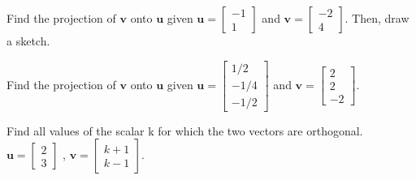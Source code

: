 \documentclass[12pt,letterpaper]{hmcpset}
\begin{document}

\begin{problem}[40]
Find the projection of $\mathbf{v}$ onto $\mathbf{u}$ given 
$\mathbf{u} = \begin{bmatrix}  -1\\ 1 \end{bmatrix} $ and 
 $\mathbf{v} = \begin{bmatrix}  -2\\ 4 \end{bmatrix} $. 
Then, draw a sketch.
\end{problem}
\begin{solution}

\end{solution}
\newpage

\begin{problem}[42]
Find the projection of $\mathbf{v}$ onto $\mathbf{u}$ given 
$\mathbf{u} = \begin{bmatrix}  1/2\\ -1/4\\ -1/2 \end{bmatrix} $ and 
 $\mathbf{v} = \begin{bmatrix}  2\\ 2\\ -2 \end{bmatrix} $. 
\end{problem}
\begin{solution}

\end{solution}
\newpage

\begin{problem}[48]
Find all values of the scalar k for which the two vectors are orthogonal. \\
$\mathbf{u} = \begin{bmatrix}  2\\ 3 \end{bmatrix} $ ,
 $\mathbf{v} = \begin{bmatrix}  k+1\\ k-1 \end{bmatrix} $.
\end{problem}
\begin{solution}

\end{solution}
\newpage
\end{document}
